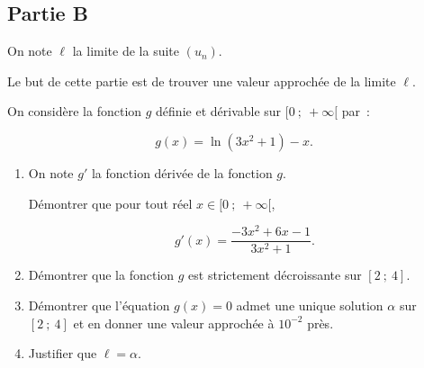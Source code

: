 \subsection*{Partie B}

On note $\ell$ la limite de la suite $(u_n)$.

Le but de cette partie est de trouver une valeur approchée de la limite $\ell$.

On considère la fonction $g$ définie et dérivable sur $[0~;~+\infty[$ par~:

\[g(x) = \ln(3x^2+1) - x.\]

\begin{enumerate}
\item On note $g'$ la fonction dérivée de la fonction $g$.

Démontrer que pour tout réel $x \in [0~;~+\infty[$,

\[g'(x) = \dfrac{-3x^2 + 6x - 1}{3x^2 + 1}.\]

\item Démontrer que la fonction $g$ est strictement décroissante sur $[2~;~4]$.
\item Démontrer que l'équation $g(x) = 0$ admet une unique solution $\alpha$ sur $[2~;~4]$ et en donner une valeur approchée à $10^{-2}$ près.
\item Justifier que $\ell = \alpha$.
\end{enumerate}

\bigskip
